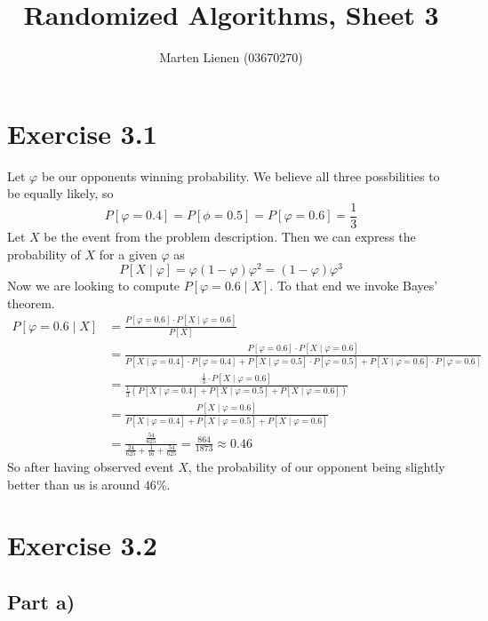 \documentclass[10pt,a4paper]{article}
\title{Randomized Algorithms, Sheet 3}
\author{Marten Lienen (03670270)}
\begin{document}
\maketitle

\section*{Exercise 3.1}

Let $\varphi$ be our opponents winning probability.
We believe all three possbilities to be equally likely, so
\begin{equation*}
  P[\varphi = 0.4] = P[\phi = 0.5] = P[\varphi = 0.6] = \frac{1}{3}
\end{equation*}
Let $X$ be the event from the problem description.
Then we can express the probability of $X$ for a given $\varphi$ as
\begin{equation*}
  P[X \mid \varphi] = \varphi(1 - \varphi)\varphi^{2} = (1 - \varphi)\varphi^{3}
\end{equation*}
Now we are looking to compute $P[\varphi = 0.6 \mid X]$.
To that end we invoke Bayes' theorem.
\begin{align*}
  P[\varphi = 0.6 \mid X] & = \frac{P[\varphi = 0.6] \cdot P[X \mid \varphi = 0.6]}{P[X]}\\
                          & = \frac{P[\varphi = 0.6] \cdot P[X \mid \varphi = 0.6]}{P[X \mid \varphi = 0.4] \cdot P[\varphi = 0.4] + P[X \mid \varphi = 0.5] \cdot P[\varphi = 0.5] + P[X \mid \varphi = 0.6] \cdot P[\varphi = 0.6]}\\
                          & = \frac{\frac{1}{3} \cdot P[X \mid \varphi = 0.6]}{\frac{1}{3}\left(P[X \mid \varphi = 0.4] + P[X \mid \varphi = 0.5] + P[X \mid \varphi = 0.6]\right)}\\
                          & = \frac{P[X \mid \varphi = 0.6]}{P[X \mid \varphi = 0.4] + P[X \mid \varphi = 0.5] + P[X \mid \varphi = 0.6]}\\
                          & = \frac{\frac{54}{625}}{\frac{24}{625} + \frac{1}{16} + \frac{54}{625}} = \frac{864}{1873} \approx 0.46
\end{align*}
So after having observed event $X$, the probability of our opponent being slightly better than us is around $46\%$.

\section*{Exercise 3.2}

\subsection*{Part a)}
\end{document}
